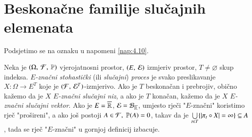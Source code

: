 
\chapter{Beskona\v cne familije slu\v cajnih elemenata}

Podsjetimo se na oznaku u napomeni \ref{nap:4.10}.

\begin{defn}    \label{defn:8.1}
    Neka je $(\Omega, \: \mathcal{F}, \: \mathbb{P})$ vjerojatnosni prostor, $({E}, \: {\mathcal{E}})$ izmjeriv prostor, $T \neq \varnothing$ skup indeksa.
    \emph{$E$-zna\v cni stohasti\v cki} (ili \emph{slu\v cajni}) \emph{proces} je svako preslikavanje $X : \Omega \to E^T$ koje je $({\mathcal{F}}, \: {\mathcal{E}^T})$-izmjerivo.
    Ako je $T$ beskona\v can i prebrojiv, obi\v cno ka\v zemo da je $X$ \emph{$E$-zna\v cni slu\v cajni niz}, a ako je $T$ kona\v can, ka\v zemo da je $X$ \emph{$E$-zna\v cni slu\v cajni vektor}.
    Ako je $E = \overline{\mathbb{R}}$, $\mathcal{E} = \mathcal{B}_{\overline{\mathbb{R}}}$, umjesto rje\v ci "$E$-zna\v cni" koristimo rje\v c "pro\v sireni", a ako jo\v s postoji $A \in \mathcal{F}, \; \mathbb{P}({A}) = 0$, takav da je $\bigcup\limits_{t \in T}^{} \{ |\pi_t \circ X| = \infty \} \subseteq A$, tada se rje\v c "$E$-zna\v cni" u gornjoj definicij izbacuje.
\end{defn}

